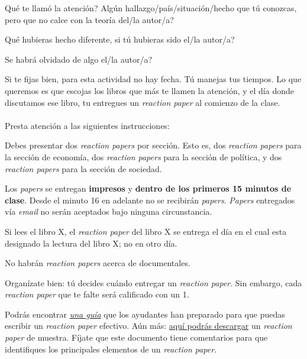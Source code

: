 \documentclass[letterpaper]{article}
\renewenvironment{itemize}{
  \begin{list}{}{
    \setlength{\leftmargin}{1.5em}
  }
}{
  \end{list}
}
\begin{document}
\begin{enumerate}
	\begin{itemize}
		\item[$\bullet$] Qu\'e te llam\'o la atenci\'on? Alg\'un hallazgo/pa\'is/situaci\'on/hecho que t\'u conozcas, pero que no calce con la teor\'ia del/la autor/a?
		\item[$\bullet$] Qu\'e hubieras hecho diferente, si t\'u hubieras sido el/la autor/a?
		\item[$\bullet$] Se habr\'a olvidado de algo el/la autor/a?
	\end{itemize}

	Si te fijas bien, para esta actividad no hay fecha. T\'u manejas tus tiempos. Lo que queremos es que escojas los libros que m\'as te llamen la atenci\'on, y el d\'ia donde discutamos ese libro, tu entregues un \emph{reaction paper} al comienzo de la clase. 
\\
\\
	Presta atenci\'on a las siguientes instrucciones:

	\begin{itemize}
		\item[$\bullet$] Debes presentar dos \emph{reaction papers} por secci\'on. Esto es, dos \emph{reaction papers} para la secci\'on de econom\'ia, dos \emph{reaction papers} para la secci\'on de pol\'itica, y dos \emph{reaction papers} para la secci\'on de sociedad.
		\item[$\bullet$] Los \emph{papers} se entregan {\bf impresos} y {\bf dentro de los primeros 15 minutos de clase}. Desde el minuto 16 en adelante no se recibir\'an \emph{papers}. \emph{Papers} entregados v\'ia \emph{email} no ser\'an aceptados bajo ninguna circunstancia.
		\item[$\bullet$] Si lees el libro X, el \emph{reaction paper} del libro X se entrega el d\'ia en el cual esta designado la lectura del libro X; no en otro d\'ia.
		\item[$\bullet$] No habr\'an \emph{reaction papers} acerca de documentales.
		\item[$\bullet$] Organ\'izate bien: t\'u decides cu\'ando entregar un \emph{reaction paper}. Sin embargo, cada \emph{reaction paper} que te falte ser\'a calificado con un 1.
		\item[$\bullet$] Podr\'as encontrar \href{https://github.com/hbahamonde/Intro_Ciencias_Sociales/raw/master/Readings/Guia_Reaction_Paper.pdf}{\emph{una gu\'ia}} que los ayudantes han preparado para que puedas escribir un \emph{reaction paper} efectivo. A\'un m\'as: \href{https://github.com/hbahamonde/Intro_Ciencias_Sociales/raw/master/Readings/Reaction_Paper_Muestra.docx}{aqu\'i podr\'as descargar} un \emph{reaction paper} de muestra. F\'ijate que este documento tiene comentarios para que identifiques los principales elementos de un \emph{reaction paper}.
	\end{itemize}



\end{enumerate}
\end{document}
